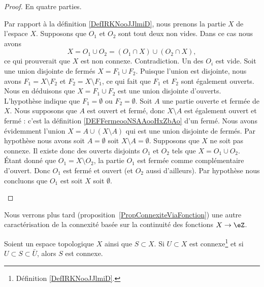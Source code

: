 \begin{proof}
	En quatre parties.
	\begin{subproof}
		Par rapport à la définition \ref{DefIRKNooJJlmiD}, nous prenons la partie \( X\) de l'espace \( X\). Supposons que \( O_1\) et \( O_2\) sont tout deux non vides. Dans ce cas nous avons
		\begin{equation}
			X= O_1\cup O_2 = (O_1\cap X)\cup (O_2\cap X),
		\end{equation}
		ce qui prouverait que \( X\) est non connexe. Contradiction. Un des \( O_i\) est vide.
		Soit une union disjointe de fermés \( X=F_1\cup F_2\). Puisque l'union est disjointe, nous avons \( F_1=X\setminus F_2\) et \( F_2=X\setminus F_1\), ce qui fait que \( F_1\) et \( F_2\) sont également ouverts. Nous en déduisons que \( X=F_1\cup F_2\) est une union disjointe d'ouverts. L'hypothèse indique que \( F_1=\emptyset\) ou \( F_2=\emptyset\).
		Soit \( A\) une partie ouverte et fermée de \( X\). Nous supposons que \( A\) est ouvert et fermé, donc \( X\setminus A\) est également ouvert et fermé : c'est la définition \ref{DEFFermeooNSAAooHxZbAo} d'un fermé. Nous avons évidemment l'union \( X=A\cup(X\setminus A)\) qui est une union disjointe de fermés. Par hypothèse nous avons soit \( A=\emptyset\) soit \( X\setminus A=\emptyset\).
		Supposons que \( X\) ne soit pas connexe. Il existe donc des ouverts disjoints \( O_1\) et \( O_2\) tels que \( X=O_1\cup O_2\). Étant donné que \( O_1=X\setminus O_2\), la partie \( O_1\) est fermée comme complémentaire d'ouvert. Donc \( O_1\) est fermé et ouvert (et \( O_2\) aussi d'ailleurs). Par hypothèse nous concluons que \( O_1\) est soit \( X\) soit \( \emptyset\).
	\end{subproof}
\end{proof}

Nous verrons plus tard (proposition~\ref{PropConnexiteViaFonction}) une autre caractérisation de la connexité basée sur la continuité des fonctions \( X\to \eZ\).

\begin{proposition}     \label{PROPooSCKNooRbewdv}
    Soient un espace topologique \( X\) ainsi que \( S\subset X\). Si \( U\subset X\) est connexe\footnote{Définition \ref{DefIRKNooJJlmiD}.} et si \( U\subset S\subset \bar U\), alors \( S\) est connexe.
\end{proposition}

